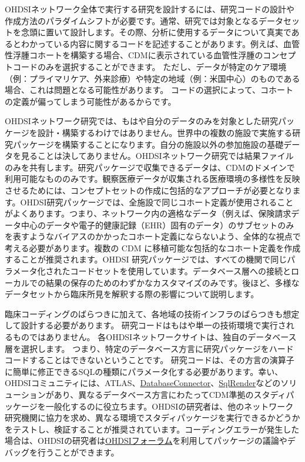 \documentclass[
  11pt]{book}
\theoremstyle{definition}
\theoremstyle{definition}
\theoremstyle{definition}
\theoremstyle{definition}
\theoremstyle{remark}
\begin{document}

OHDSIネットワーク全体で実行する研究を設計するには、研究コードの設計や作成方法のパラダイムシフトが必要です。通常、研究では対象となるデータセットを念頭に置いて設計します。その際、分析に使用するデータについて真実であるとわかっている内容に関するコードを記述することがあります。例えば、血管性浮腫コホートを構築する場合、CDMに表示されている血管性浮腫のコンセプトコードのみを選択することができます。 ただし、データが特定のケア環境（例：プライマリケア、外来診療）や特定の地域（例：米国中心）のものである場合、これは問題となる可能性があります。 コードの選択によって、コホートの定義が偏ってしまう可能性があるからです。

OHDSIネットワーク研究では、もはや自分のデータのみを対象とした研究パッケージを設計・構築するわけではありません。世界中の複数の施設で実施する研究パッケージを構築することになります。自分の施設以外の参加施設の基礎データを見ることは決してありません。OHDSIネットワーク研究では結果ファイルのみを共有します。研究パッケージで収集できるデータは、CDMのドメインで利用可能なもののみです。観察医療データが収集される医療環境の多様性を反映させるためには、コンセプトセットの作成に包括的なアプローチが必要となります。OHDSI研究パッケージでは、全施設で同じコホート定義が使用されることがよくあります。つまり、ネットワーク内の適格なデータ（例えば、保険請求データ中心のデータや電子的健康記録（EHR）固有のデータ）のサブセットのみを表すようなバイアスのかかったコホート定義にならないよう、全体的な視点で考える必要があります。複数の CDM に移植可能な包括的なコホート定義を作成することが推奨されます。OHDSI 研究パッケージでは、すべての機関で同じパラメータ化されたコードセットを使用しています。データベース層への接続とローカルでの結果の保存のためのわずかなカスタマイズのみです。後ほど、多様なデータセットから臨床所見を解釈する際の影響について説明します。

臨床コーディングのばらつきに加えて、各地域の技術インフラのばらつきも想定して設計する必要があります。 研究コードはもはや単一の技術環境で実行されるものではありません。 各OHDSIネットワークサイトは、独自のデータベース層を選択します。 つまり、特定のデータベース方言に研究パッケージをハードコードすることはできないということです。 研究コードは、その方言の演算子に簡単に修正できるSQLの種類にパラメータ化する必要があります。幸い、OHDSIコミュニティには、ATLAS、\href{https://ohdsi.github.io/DatabaseConnector/}{DatabaseConnector}、\href{https://ohdsi.github.io/SqlRender/}{SqlRender}などのソリューションがあり、異なるデータベース方言にわたってCDM準拠のスタディパッケージを一般化するのに役立ちます。OHDSIの研究者は、他のネットワーク研究機関に協力を求め、異なる環境でスタディパッケージを実行できるかどうかをテストし、検証することが推奨されています。コーディングエラーが発生した場合は、OHDSIの研究者は\href{http://forums.ohdsi.org/}{OHDSIフォーラム}を利用してパッケージの議論やデバッグを行うことができます。
\end{document}
